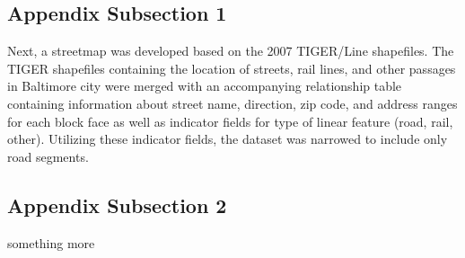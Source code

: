 \subsection*{Appendix Subsection 1}

Next, a streetmap was developed based on the 2007 TIGER/Line shapefiles. The TIGER shapefiles containing the location of streets, rail lines, and other passages in Baltimore city were merged with an accompanying relationship table containing information about street name, direction, zip code, and address ranges for each block face as well as indicator fields for type of linear feature (road, rail, other). Utilizing these indicator fields, the dataset was narrowed to include only road segments.

\subsection*{Appendix Subsection 2}

something more